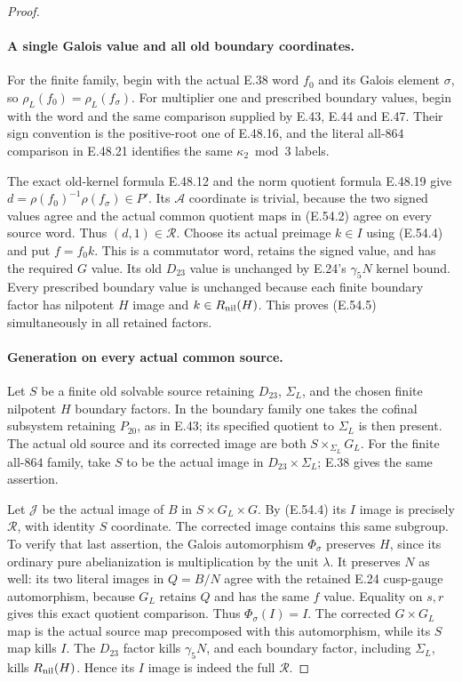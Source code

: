 \begin{proof}
\paragraph{A single Galois value and all old boundary coordinates.}
For the finite family, begin with the actual E.38 word
$f_0$ and its Galois element $\sigma$, so
$\rho_L(f_0)=\rho_L(f_\sigma)$.
For multiplier one and prescribed boundary values, begin
with the word and the same comparison supplied by E.43,
E.44 and E.47.  Their sign convention is the positive-root
one of E.48.16, and the literal all-$864$ comparison in
E.48.21 identifies the same $\kappa_2\bmod3$ labels.

The exact old-kernel formula E.48.12 and the norm quotient
formula E.48.19 give
$d=\rho(f_0)^{-1}\rho(f_\sigma)\in P'$.
Its $\mathcal A$ coordinate is trivial, because the two
signed values agree and the actual common quotient maps
in \textup{(E.54.2)} agree on every source word.
Thus $(d,1)\in\mathcal R$.
Choose its actual preimage $k\in I$ using
\textup{(E.54.4)} and put $f=f_0k$.
This is a commutator word, retains the signed value, and
has the required $G$ value.  Its old $D_{23}$ value is
unchanged by E.24's $\gamma_5N$ kernel bound.
Every prescribed boundary value is unchanged because
each finite boundary factor has nilpotent $H$ image and
$k\in R_{\rm nil}(H)$.  This proves
\textup{(E.54.5)} simultaneously in all retained factors.

\paragraph{Generation on every actual common source.}
Let $S$ be a finite old solvable source retaining $D_{23}$,
$\Sigma_L$, and the chosen finite nilpotent $H$ boundary
factors.  In the boundary family one takes the cofinal
subsystem retaining $P_{20}$, as in E.43; its specified
quotient to $\Sigma_L$ is then present.  The actual old
source and its corrected image are both
$S\times_{\Sigma_L}G_L$.  For the finite all-$864$ family,
take $S$ to be the actual image in $D_{23}\times\Sigma_L$;
E.38 gives the same assertion.

Let $\mathcal J$ be the actual image of $B$ in
$S\times G_L\times G$.  By \textup{(E.54.4)} its $I$
image is precisely $\mathcal R$, with identity $S$
coordinate.  The corrected image contains this same
subgroup.  To verify that last assertion, the Galois
automorphism $\Phi_\sigma$ preserves $H$, since its
ordinary pure abelianization is multiplication by the
unit $\lambda$.  It preserves $N$ as well: its two literal
images in $Q=B/N$ agree with the retained E.24 cusp-gauge
automorphism, because $G_L$ retains $Q$ and has the same
$f$ value.  Equality on $s,r$ gives this exact quotient
comparison.  Thus $\Phi_\sigma(I)=I$.  The corrected
$G\times G_L$ map is the actual source map precomposed
with this automorphism, while its $S$ map kills $I$.
The $D_{23}$ factor kills $\gamma_5N$, and each boundary
factor, including $\Sigma_L$, kills $R_{\rm nil}(H)$.
Hence its $I$ image is indeed the full $\mathcal R$.


\end{proof}
